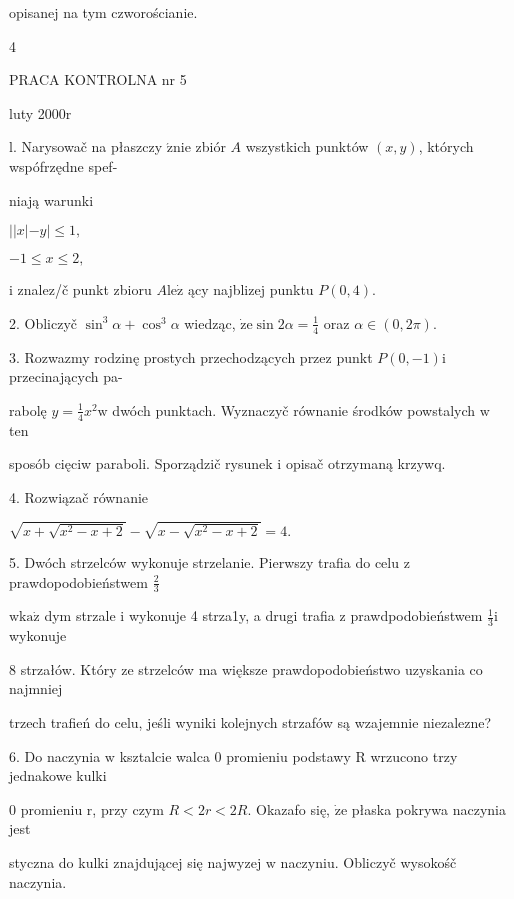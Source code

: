 \documentclass[a4paper,12pt]{article}
\begin{document}
opisanej na tym czworościanie.

4





PRACA KONTROLNA nr 5

luty 2000r

l. Narysowač na płaszczy $\acute{\mathrm{z}}\mathrm{n}\mathrm{i}\mathrm{e}$ zbiór $A$ wszystkich punktów $(x,y)$, których wspófrzędne spef-

niają warunki

$||x| -y| \leq 1,$

$-1\leq x\leq 2,$

$\mathrm{i}$ znalez/č punkt zbioru $A\mathrm{l}\mathrm{e}\dot{\mathrm{z}}$ ący najblizej punktu $P(0,4).$

2. Obliczyč $\sin^{3}\alpha+\cos^{3}\alpha$ wiedząc, $\displaystyle \dot{\mathrm{z}}\mathrm{e}\sin 2\alpha=\frac{1}{4}$ oraz $\alpha\in (0,2\pi).$

3. Rozwazmy rodzinę prostych przechodzących przez punkt $P(0,-1) \mathrm{i}$ przecinających pa-

rabolę $y = \displaystyle \frac{1}{4}x^{2} \mathrm{w}$ dwóch punktach. Wyznaczyč równanie środków powstalych $\mathrm{w}$ ten

sposób cięciw paraboli. Sporządzič rysunek $\mathrm{i}$ opisač otrzymaną krzywq.

4. Rozwiązač równanie

$\sqrt{x+\sqrt{x^{2}-x+2}}-\sqrt{x-\sqrt{x^{2}-x+2}}=4.$

5. Dwóch strzelców wykonuje strzelanie. Pierwszy trafia do celu $\mathrm{z}$ prawdopodobieństwem $\displaystyle \frac{2}{3}$

$\mathrm{w}\mathrm{k}\mathrm{a}\dot{\mathrm{z}}$ dym strzale $\mathrm{i}$ wykonuje 4 strza1y, a drugi trafia $\mathrm{z}$ prawdpodobieństwem $\displaystyle \frac{1}{3}\mathrm{i}$ wykonuje

8 strzałów. Który ze strzelców ma większe prawdopodobieństwo uzyskania co najmniej

trzech trafień do celu, jeśli wyniki kolejnych strzafów są wzajemnie niezalezne?

6. Do naczynia $\mathrm{w}$ ksztalcie walca $0$ promieniu podstawy $\mathrm{R}$ wrzucono trzy jednakowe kulki

$0$ promieniu $\mathrm{r}$, przy czym $R< 2r < 2R$. Okazafo się, $\dot{\mathrm{z}}\mathrm{e}$ płaska pokrywa naczynia jest

styczna do kulki znajdującej się najwyzej $\mathrm{w}$ naczyniu. Obliczyč wysokośč naczynia.
\end{document}
